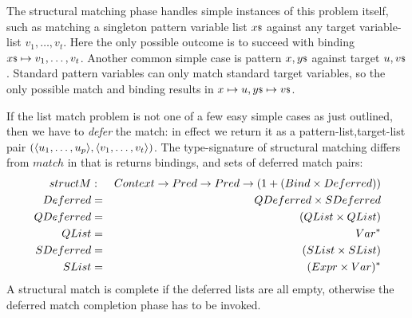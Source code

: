 The structural matching phase handles simple instances of this problem itself,
such as matching a singleton pattern variable list ${x}{\scriptstyle\$}$ against any target
variable-list $v_1,\ldots,v_t$.
Here the only possible outcome is to succeed with binding ${x}{\scriptstyle\$} \mapsto v_1,\ldots,v_t$.
Another common simple case is pattern $x,{y}{\scriptstyle\$}$ against target $u,{v}{\scriptstyle\$}$.
Standard pattern variables can only match standard target variables,
so the only possible match and binding results in
$ x \mapsto u, {y}{\scriptstyle\$} \mapsto {v}{\scriptstyle\$}$.

If the list match problem is not one of a few easy simple cases as just outlined,
then we have to \emph{defer} the match: in effect we return
it as a pattern-list,target-list pair $(\langle u_1,\ldots,u_p\rangle,\langle v_1,\ldots,v_t\rangle)$.
The type-signature of structural matching differs from $match$
in that is returns bindings, and sets of deferred match pairs:
\begin{eqnarray*}
   structM &:& Context \rightarrow Pred \rightarrow Pred \rightarrow (1 + (Bind \times Deferred))
\\ Deferred &=& QDeferred \times SDeferred
\\ QDeferred &=& (QList \times QList)
\\ QList &=& Var^*
\\ SDeferred &=& (SList \times SList)
\\ SList &=& (Expr \times Var)^*
\end{eqnarray*}
A structural match is complete if the deferred lists are all empty,
otherwise the deferred match completion phase has to be invoked.
